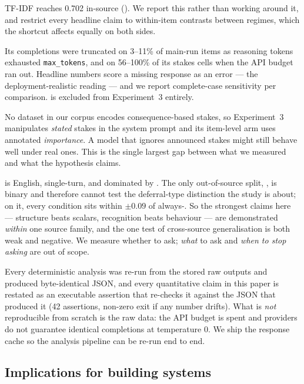  TF-IDF reaches 0.702 in-source
(). We report this rather than working around it, and restrict every headline
claim to within-item contrasts between regimes, which the shortcut affects equally on both sides.

 Its completions were truncated on 3--11\% of main-run items
as reasoning tokens exhausted \texttt{max\_tokens}, and on 56--100\% of its stakes cells when the
API budget ran out. Headline numbers score a missing response as an error --- the
deployment-realistic reading --- and we report complete-case sensitivity per comparison. \gptfive is
excluded from Experiment~3 entirely.

 No dataset in our corpus encodes consequence-based
stakes, so Experiment~3 manipulates \emph{stated} stakes in the system prompt and its item-level arm
uses annotated \emph{importance}. A model that ignores announced stakes might still behave well
under real ones. This is the single largest gap between what we measured and what the hypothesis
claims.

 \carb is English,
single-turn, and dominated by \coconot. The only out-of-source split, \clamber, is binary and
therefore cannot test the deferral-type distinction the study is about; on it, every condition sits
within $\pm0.09$ of always-\act. So the strongest claims here --- structure beats scalars,
recognition beats behaviour --- are demonstrated \emph{within} one source family, and the one test
of cross-source generalisation is both weak and negative. We measure whether to ask; \emph{what} to
ask and \emph{when to stop asking} are out of scope.

 Every deterministic analysis was re-run from
the stored raw outputs and produced byte-identical JSON, and every quantitative claim in this paper
is restated as an executable assertion that re-checks it against the JSON that produced it (42
assertions, non-zero exit if any number drifts). What is \emph{not} reproducible from scratch is the
raw data: the API budget is spent and providers do not guarantee identical completions at
temperature 0. We ship the response cache so the analysis pipeline can be re-run end to end.

\subsection{Implications for building systems}

